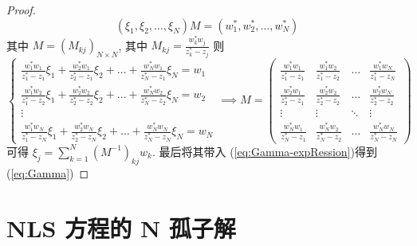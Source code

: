 \begin{proof}
\begin{equation}
    (\xi_{1}, \xi_{2}, \dots, \xi_{N}) M =  (w_{1}^{*}, w_{2}^{*}, \dots, w_{N}^{*})
  \end{equation}
  其中 $ M = (M_{kj})_{N \times N} $, 其中 $ M_{kj} = \frac{w_{k}^{*}w_{j}}{z_{k}^{*} - z_{j}} $ 则
  \begin{equation}
    \begin{cases}
      \frac{w_{1}^{*}w_{1}}{z_{1}^{*}- z_{1}} \xi_{1} + \frac{w_{2}^{*}w_{1}}{z_{2}^{*} - z_{1}} \xi_{2} + \dots + \frac{w_{N}^{*}w_{1}}{z_{N}^{*} - z_{1}} \xi_{N} = w_{1} \\
      \frac{w_{1}^{*}w_{2}}{z_{1}^{*}- z_{2}} \xi_{1} + \frac{w_{2}^{*}w_{2}}{z_{2}^{*} - z_{2}} \xi_{2} + \dots + \frac{w_{N}^{*}w_{2}}{z_{N}^{*} - z_{2}} \xi_{N} = w_{2} \\
      \vdots \\
      \frac{w_{1}^{*}w_{N}}{z_{1}^{*}- z_{N}} \xi_{1} + \frac{w_{2}^{*}w_{N}}{z_{2}^{*} - z_{N}} \xi_{2} + \dots + \frac{w_{N}^{*}w_{N}}{z_{N}^{*} - z_{N}} \xi_{N} = w_{N}
    \end{cases} 
    \implies M = \begin{pmatrix}
      \frac{w_{1}^{*}w_{1}}{z_{1}^{*} - z_{1}} & \frac{w_{1}^{*}w_{2}}{z_{1}^{*} - z_{2}} & \dots & \frac{w_{1}^{*}w_{N}}{z_{1}^{*} - z_{N}} \\
      \frac{w_{2}^{*}w_{1}}{z_{2}^{*} - z_{1}} & \frac{w_{2}^{*}w_{2}}{z_{2}^{*} - z_{2}} & \dots & \frac{w_{2}^{*}w_{N}}{z_{2}^{*} - z_{2}} \\
      \vdots & \vdots & \ddots & \vdots \\
      \frac{w_{N}^{*}w_{1}}{z_{N}^{*} - z_{1}} & \frac{w_{N}^{*}w_{2}}{z_{N}^{*} - z_{2}} & \dots & \frac{w_{N}^{*}w_{N}}{z_{N}^{*} - z_{N}}
    \end{pmatrix}
  \end{equation}
  可得 $ \xi_{j} = \sum_{k =1}^{N}(M^{-1})_{kj} w_{k} $. 最后将其带入 (\ref{eq:Gamma-expRession})得到 (\ref{eq:Gamma})
\end{proof}

\section{NLS 方程的 N 孤子解}
